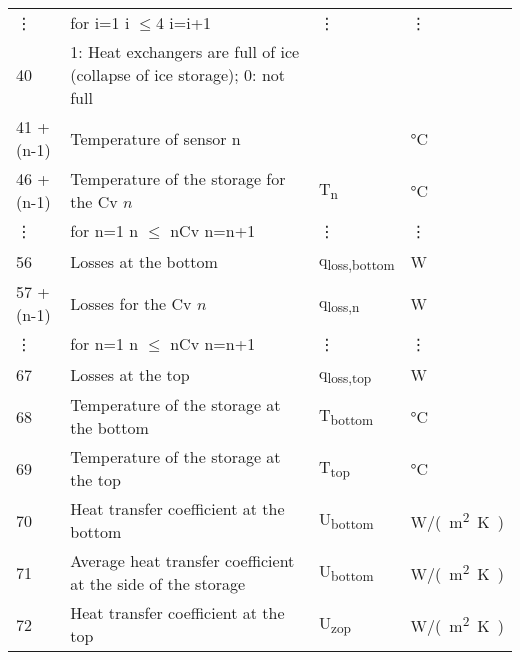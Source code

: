 \documentclass[english]{SPFReport}
\begin{document}
\begin{longtable}{| l |  m{8cm} | l | l |}
\vdots   &  for i=1 i $\leq$4 i=i+1 & \vdots & \vdots\\
40 & 1: Heat exchangers are full of ice (collapse of ice storage); 0: not full &  & \\
41 +(n-1) & Temperature of sensor n &&\si{\degreeCelsius}\\
46 +(n-1) & Temperature of the storage for the Cv $n$ & \si{T_{n}} & \si{\degreeCelsius}   \\
\vdots   &  for n=1 n $\leq$ nCv n=n+1 & \vdots & \vdots \\
56 & Losses at the bottom & \si{q_{loss,bottom}} & W   \\
57 +(n-1) & Losses for the Cv $n$ & \si{q_{loss,n}} & W   \\
\vdots   &  for n=1 n $\leq$ nCv n=n+1 & \vdots & \vdots \\
67 & Losses at the top & \si{q_{loss,top}} & W  \\
68 & Temperature of the storage at the bottom & \si{T_{bottom}} & \si{\degreeCelsius}   \\
69 & Temperature of the storage at the top & \si{T_{top}} & \si{\degreeCelsius}   \\
70 & Heat transfer coefficient at the bottom & \si{U_{bottom}} & \si{W/(m^2K)}\\
71 & Average heat transfer coefficient at the side of the storage & \si{U_{bottom}} &  \si{W/(m^2K)} \\
72 & Heat transfer coefficient at the top & \si{U_{zop}} & \si{W/(m^2K)} \\
\hline
\end{longtable}




\clearpage


\end{document}
